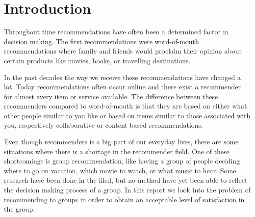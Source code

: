 \chapter{Introduction} 
Throughout time recommendations have often been a determined factor in decision making.
The first recommendations were word-of-mouth recommendations where family and friends would proclaim their opinion about certain products like movies, books, or travelling destinations. 

In the past decades the way we receive these recommendations have changed a lot. Today recommendations often occur online and there exist a recommender for almost every item or service available. The difference between these recommenders compared to word-of-mouth is that they are based on either what other people similar to you like or based on items similar to those associated with you, respectively collaborative or content-based recommendations.

Even though recommenders is a big part of our everyday lives, there are some situations where there is a shortage in the recommender field. One of these shortcomings is group recommendation, like having a group of people deciding where to go on vacation, which movie to watch, or what music to hear. Some research have been done in the filed, but no method have yet been able to reflect the decision making process of a group. In this report we look into the problem of recommending to groups in order to obtain an acceptable level of satisfaction in the group.







